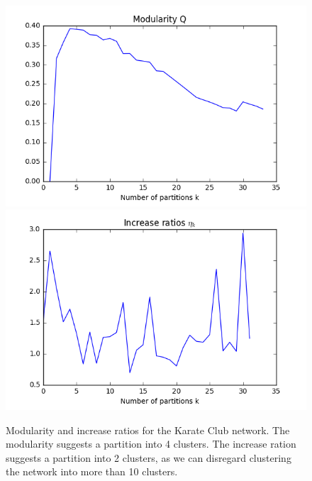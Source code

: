 \documentclass[12pt]{article}
\theoremstyle{definition}
\begin{document}
\begin{figure}
	\includegraphics[scale=0.44]{karate_graph_Q}
	\includegraphics[scale=0.44]{karate_graph_eta}
	\centering
	\caption{Modularity and increase ratios for the Karate Club network. The modularity suggests a partition into 4 clusters. The increase ration suggests a partition into 2 clusters, as we can disregard clustering the network into more than 10 clusters.}
	\label{fig_karate_eval}
\end{figure}
\end{document}
